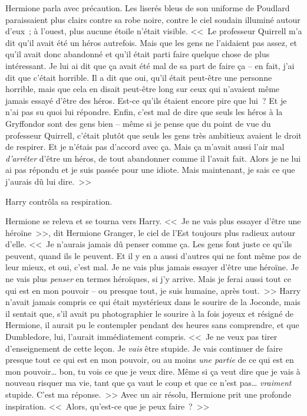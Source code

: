 Hermione parla avec précaution. Les liserés bleus de son uniforme de Poudlard paraissaient plus clairs contre sa robe noire, contre le ciel soudain illuminé autour d'eux~; à l'ouest, plus aucune étoile n'était visible. <<~Le professeur Quirrell m'a dit qu'il avait été un héros autrefois. Mais que les gens ne l'aidaient pas assez, et qu'il avait donc abandonné et qu'il était parti faire quelque chose de plus intéressant. Je lui ai dit que ça avait été mal de sa part de faire ça -- en fait, j'ai dit que c'était horrible. Il a dit que oui, qu'il était peut-être une personne horrible, mais que cela en disait peut-être long sur ceux qui n'avaient même jamais essayé d'être des héros. Est-ce qu'ils étaient encore pire que lui~? Et je n'ai pas su quoi lui répondre. Enfin, c'est mal de dire que seuls les héros à la Gryffondor sont des gens bien -- même si je pense que du point de vue du professeur Quirrell, c'était plutôt que seuls les gens très ambitieux avaient le droit de respirer. Et je n'étais pas d'accord avec ça. Mais ça m'avait aussi l'air mal \emph{d'arrêter} d'être un héros, de tout abandonner comme il l'avait fait. Alors je ne lui ai pas répondu et je suis passée pour une idiote. Mais maintenant, je sais ce que j'aurais dû lui dire.~>>

Harry contrôla sa respiration.

Hermione se releva et se tourna vers Harry. <<~Je ne vais plus essayer d'être une héroïne~>>, dit Hermione Granger, le ciel de l'Est toujours plus radieux autour d'elle. <<~Je n'aurais jamais dû penser comme ça. Les gens font juste ce qu'ils peuvent, quand ils le peuvent. Et il y en a aussi d'autres qui ne font même pas de leur mieux, et oui, c'est mal. Je ne vais plus jamais essayer d'être une héroïne. Je ne vais plus \emph{penser} en termes héroïques, si j'y arrive. Mais je ferai aussi tout ce qui est en mon pouvoir -- ou presque tout, je suis humaine, après tout.~>> Harry n'avait jamais compris ce qui était mystérieux dans le sourire de la Joconde, mais il sentait que, s'il avait pu photographier le sourire à la fois joyeux et résigné de Hermione, il aurait pu le contempler pendant des heures sans comprendre, et que Dumbledore, lui, l'aurait immédiatement compris. <<~Je ne veux pas tirer d'enseignement de cette leçon. Je \emph{vais} être stupide. Je vais continuer de faire presque tout ce qui est en mon pouvoir, ou au moins \emph{une partie} de ce qui est en mon pouvoir… bon, tu vois ce que je veux dire. Même si ça veut dire que je vais à nouveau risquer ma vie, tant que ça vaut le coup et que ce n'est pas… \emph{vraiment} stupide. C'est ma réponse.~>> Avec un air résolu, Hermione prit une profonde inspiration. <<~Alors, qu'est-ce que je peux faire~?~>>


